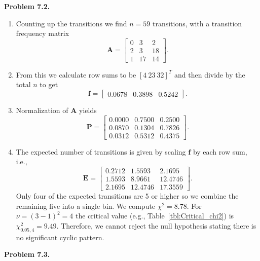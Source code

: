 \noindent
\bf{Problem 7.2.} \\

\begin{enumerate}[label=\alph*)]
\item  Counting up the transitions we find $n = 59$ transitions, with a transition frequency matrix
$$
\mathbf{A} = \left [ \begin{array}{ccc}
0   &    3   &   2  \\
2   &    3   &  18  \\
1   &    17  &  14
\end{array} \right ].
$$
\item From this we calculate row sums to be $[ 4 \ 23 \ 32 ]^T$ and then
divide by the total $n$ to get
$$
\mathbf{f} = \left [ \begin{array}{cccc}
0.0678 & 0.3898 & 0.5242
\end{array} \right ].
$$

\item Normalization of $\mathbf{A}$ yields
$$
\mathbf{P} = \left [ \begin{array}{ccc}
0.0000  &  0.7500  &  0.2500    \\
0.0870  &  0.1304  &  0.7826   \\
0.0312  &  0.5312  &  0.4375 
\end{array} \right ].
$$

\item The expected number of transitions is given by scaling $\mathbf{f}$ by each row sum, i.e.,
$$
\mathbf{E} = \left [ \begin{array}{ccc}
    0.2712  &  1.5593  &  2.1695 \\
    1.5593  &  8.9661  &  12.4746 \\
    2.1695  &  12.4746 &  17.3559
\end{array} \right ].
$$
Only four of the expected transitions are 5 or higher so we combine the remaining five into a single
bin.  We compute $\chi^2 = 8.78$.
For $\nu = (3-1)^2 = 4$ the critical value (e.g., Table~\ref{tbl:Critical_chi2}) is $\chi^2_{0.05,4} = 9.49$.
Therefore, we cannot reject the null hypothesis stating there is no significant cyclic pattern.
\end{enumerate}

\noindent
\bf{Problem 7.3.} \\

